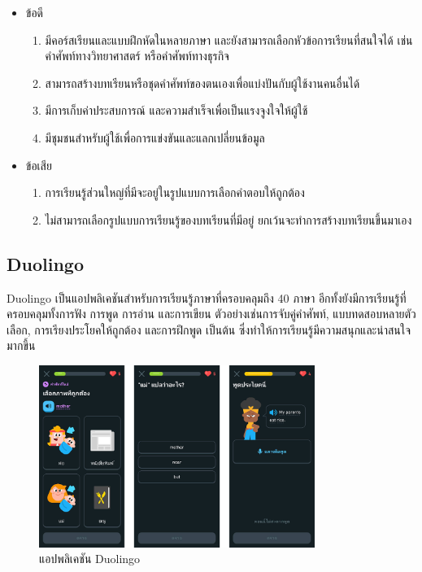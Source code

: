 \documentclass[12pt,oneside,openright,a4paper]{cpe-thai-project}
\begin{document}
\begin{itemize}
	\item ข้อดี
	      \begin{enumerate}
		      \item มีคอร์สเรียนและแบบฝึกหัดในหลายภาษา และยังสามารถเลือกหัวข้อการเรียนที่สนใจได้ เช่นคำศัพท์ทางวิทยาศาสตร์ หรือคำศัพท์ทางธุรกิจ
		      \item สามารถสร้างบทเรียนหรือชุดคำศัพท์ของตนเองเพื่อแบ่งปันกับผู้ใช้งานคนอื่นได้
		      \item มีการเก็บค่าประสบการณ์ และความสำเร็จเพื่อเป็นแรงจูงใจให้ผู้ใช้
		      \item มีชุมชนสำหรับผู้ใช้เพื่อการแข่งขันและแลกเปลี่ยนข้อมูล
	      \end{enumerate}
	\item ข้อเสีย
	      \begin{enumerate}
		      \item การเรียนรู้ส่วนใหญ่ที่มีจะอยู่ในรูปแบบการเลือกคำตอบให้ถูกต้อง
		      \item ไม่สามารถเลือกรูปแบบการเรียนรู้ของบทเรียนที่มีอยู่ ยกเว้นจะทำการสร้างบทเรียนขึ้นมาเอง
	      \end{enumerate}
\end{itemize}

\pagebreak
\subsection{Duolingo \cite{Duolingo}}

\hspace{1cm}
Duolingo เป็นแอปพลิเคชันสำหรับการเรียนรู้ภาษาที่ครอบคลุมถึง 40 ภาษา อีกทั้งยังมีการเรียนรู้ที่ครอบคลุมทั้งการฟัง การพูด การอ่าน และการเขียน
ตัวอย่างเช่นการจับคู่คำศัพท์, แบบทดสอบหลายตัวเลือก, การเรียงประโยคให้ถูกต้อง และการฝึกพูด เป็นต้น ซึ่งทำให้การเรียนรู้มีความสนุกและน่าสนใจมากขึ้น

\begin{figure}[!h]\centering
	\includegraphics[width=0.8\textwidth, keepaspectratio=true]{image/chap2/duolingoEX.png}
	\caption{แอปพลิเคชัน Duolingo}\label{fig:duolingoEX}
\end{figure}
\end{document}
